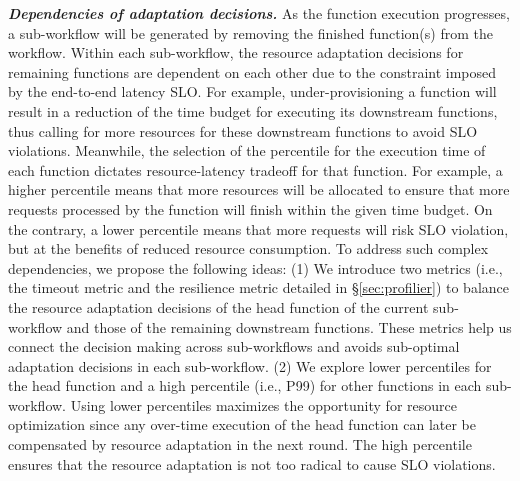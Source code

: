 
\textbf{\textit{Dependencies of adaptation decisions.}}
As the function execution progresses, a sub-workflow will be generated by removing the finished function(s) from the workflow. Within each sub-workflow, the resource adaptation decisions for remaining functions are dependent on each other due to the constraint imposed by the end-to-end latency SLO. For example, under-provisioning a function will result in a reduction of the time budget for executing its downstream functions, thus calling for more resources for these downstream functions to avoid SLO violations. Meanwhile, the selection of the percentile for the execution time of each function dictates resource-latency tradeoff for that function. For example, a higher percentile means that more resources will be allocated to ensure that more requests processed by the function will finish within the given time budget. On the contrary, a lower percentile means that more requests will risk SLO violation, but at the benefits of reduced resource consumption. To address such complex dependencies, we propose the following ideas: (1) We introduce two metrics (i.e., the timeout metric and the resilience metric detailed in \S\ref{sec:profilier}) to balance the resource adaptation decisions of the head function of the current sub-workflow and those of the remaining downstream functions. These metrics help us connect the decision making across sub-workflows and avoids sub-optimal adaptation decisions in each sub-workflow. 
(2) We explore lower percentiles for the head function and a high percentile (i.e., P99) for other functions in each sub-workflow. Using lower percentiles maximizes the opportunity for resource optimization since any over-time execution of the head function can later be compensated by resource adaptation in the next round. The high percentile ensures that the resource adaptation is not too radical to cause SLO violations. 

